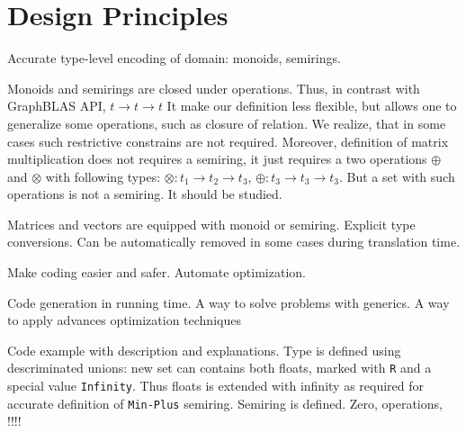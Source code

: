 \section{Design Principles}

Accurate type-level encoding of domain: monoids, semirings.

Monoids and semirings are closed under operations. 
Thus, in contrast with GraphBLAS API, $t \to t \to t$  
It make our definition less flexible, but allows one to generalize some operations, such as closure of relation.
We realize, that in some cases such restrictive constrains are not required.
Moreover, definition of matrix multiplication does not requires a semiring, it just requires a two operations $\oplus$ and $\otimes$ with following types: $\otimes: t_1 \to t_2 \to t_3$, $\oplus: t_3 \to t_3 \to t_3 $. 
But a set with such operations is not a semiring. 
It should be studied.

Matrices and vectors are equipped with monoid or semiring.
Explicit type conversions. 
Can be automatically removed in some cases during translation time.

Make coding easier and safer. 
Automate optimization.

Code generation in running time.
A way to solve problems with generics.
A way to apply advances optimization techniques~\cite{10.1145/3332466.3374507}

Code example with description and explanations.
Type is defined using descriminated unions: new set can contains both floats, marked with  \texttt{R} and a special value \texttt{Infinity}.
Thus floats is extended with infinity as required for accurate definition of \texttt{Min-Plus} semiring.
Semiring is defined.
Zero, operations, !!!!


